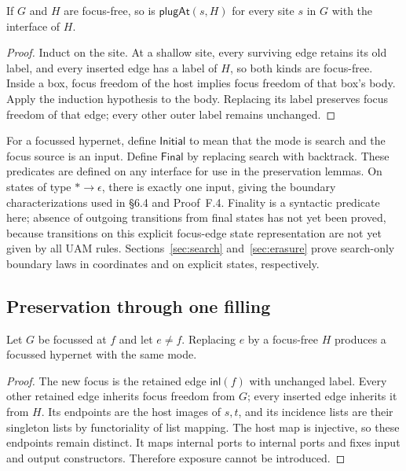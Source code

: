 \begin{lemma}
If $G$ and $H$ are focus-free, so is $\mathsf{plugAt}(s,H)$ for every site $s$ in $G$
with the interface of $H$.
\end{lemma}
\begin{proof}
Induct on the site. At a shallow site, every surviving edge retains its old
label, and every inserted edge has a label of $H$, so both kinds are focus-free.
Inside a box, focus freedom of the host implies focus freedom of that box's
body. Apply the induction hypothesis to the body. Replacing its label preserves
focus freedom of that edge; every other outer label remains unchanged.
\end{proof}

\begin{definition}\label{term:boundary-finality}
For a focussed hypernet, define $\mathsf{Initial}$ to mean that the mode is
search and the focus source is an input. Define $\mathsf{Final}$ by replacing
search with backtrack. These predicates are defined on any interface for use
in the preservation lemmas. On states of type $*\to\epsilon$, there is exactly
one input, giving the boundary characterizations used in \S6.4 and Proof~F.4.
Finality is a syntactic predicate here; absence of outgoing transitions from
final states has not yet been proved, because transitions on this explicit focus-edge state representation are not yet
given by all UAM rules. Sections~\ref{sec:search} and~\ref{sec:erasure} prove
search-only boundary laws in coordinates and on explicit states, respectively.
\end{definition}

\subsection{Preservation through one filling}
\begin{lemma}
Let $G$ be focussed at $f$ and let $e\ne f$. Replacing $e$ by a focus-free $H$
produces a focussed hypernet with the same mode.
\end{lemma}
\begin{proof}
The new focus is the retained edge $\mathsf{inl}(f)$ with unchanged label.
Every other retained edge inherits focus freedom from $G$; every inserted edge
inherits it from $H$. Its endpoints are the host images of $s,t$, and its
incidence lists are their singleton lists by functoriality of list mapping.
The host map is injective, so these endpoints remain distinct. It maps internal
ports to internal ports and fixes input and output constructors. Therefore
exposure cannot be introduced.
\end{proof}

